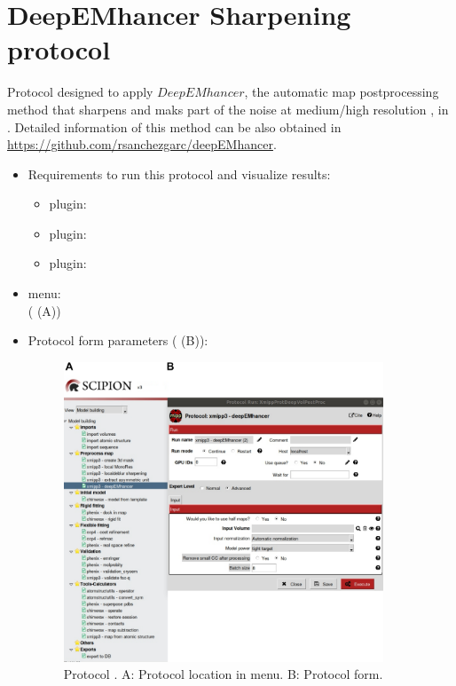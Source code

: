 \section{DeepEMhancer Sharpening protocol}
\label{app:deepEMhancerSharpening}%

Protocol designed to apply $DeepEMhancer$, the automatic map postprocessing method that sharpens and maks part of the noise at medium/high resolution \citep{Sanchez-Garcia2020.06.12.148296}, in \scipion. Detailed information of this method can be also obtained in \url{https://github.com/rsanchezgarc/deepEMhancer}.

\begin{itemize}
 \item Requirements to run this protocol and visualize results:
    \begin{itemize}
        \item \scipion plugin: 
        \item \scipion plugin: 
        \item \scipion plugin: 
    \end{itemize}
 \item \scipion menu:\\
   ( (A))
  
 \item Protocol form parameters ( (B)):
  
    \begin{figure}[H]
     \centering 
     \captionsetup{width=.7\linewidth} 
     \includegraphics[width=0.90\textwidth]{Images_appendix/Fig303}
     \caption{Protocol . A: Protocol location in \scipion menu. B: Protocol form.}
     \label{fig:app_deepEMhancer_1}
    \end{figure}
    

\end{itemize}
